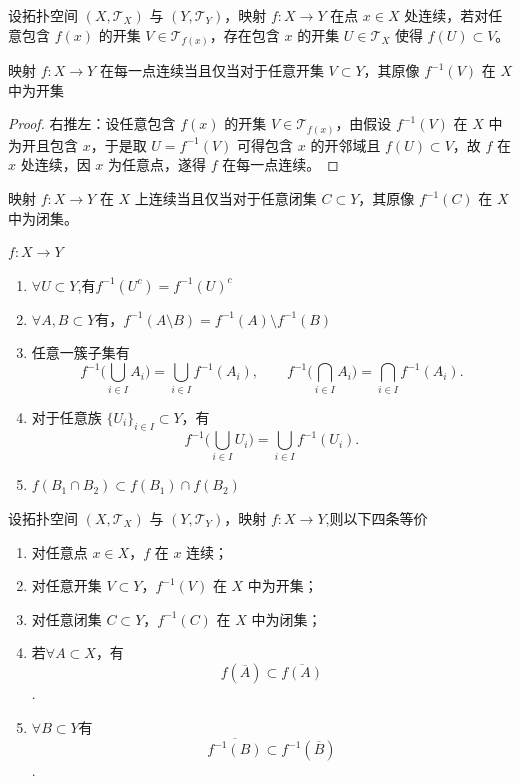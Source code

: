 \documentclass[lang=cn,a4paper,newtx,figureplace=section,tableplace=section]{elegantbook}
\begin{document}
\begin{definition}[连续性]\label{def:continuity}设拓扑空间 $(X,\mathcal{T}_X)$ 与 $(Y,\mathcal{T}_Y)$，映射 $f:X\to Y$ 在点 $x\in X$ 处连续，若对任意包含 $f(x)$ 的开集 $V\in\mathcal{T}_{f(x)}$，存在包含 $x$ 的开集 $U\in\mathcal{T}_X$ 使得 $f(U)\subset V$。\end{definition}
\begin{proposition}
映射 $f:X\to Y$ 在每一点连续当且仅当对于任意开集 $V\subset Y$，其原像 $f^{-1}(V)$ 在 $X$ 中为开集
\end{proposition}
\begin{proof}
    右推左：设任意包含 $f(x)$ 的开集 $V\in\mathcal{T}_{f(x)}$，由假设 $f^{-1}(V)$ 在 $X$ 中为开且包含 $x$，于是取 $U=f^{-1}(V)$ 可得包含 $x$ 的开邻域且 $f(U)\subset V$，故 $f$ 在 $x$ 处连续，因 $x$ 为任意点，遂得 $f$ 在每一点连续。
\end{proof}
\begin{proposition}映射 $f:X\to Y$ 在 $X$ 上连续当且仅当对于任意闭集 $C\subset Y$，其原像 $f^{-1}(C)$ 在 $X$ 中为闭集。\end{proposition}
\begin{proposition}
    $f:X\to Y$ 
    \begin{enumerate}
        \item $\forall U\subset Y$,有$f^{-1}(U^c)=f^{-1}(U)^c$
        \item $\forall A,B\subset Y$有，$f^{-1}(A\setminus B)=f^{-1}(A)\setminus f^{-1}(B)$
        \item 任意一簇子集有
\begin{equation}
f^{-1}\Big(\bigcup_{i\in I}A_i\Big)=\bigcup_{i\in I}f^{-1}(A_i),\qquad
f^{-1}\Big(\bigcap_{i\in I}A_i\Big)=\bigcap_{i\in I}f^{-1}(A_i).
\end{equation}
        \item 对于任意族 $\{U_i\}_{i\in I}\subset Y$，有
\begin{equation*}
f^{-1}\Big(\bigcup_{i\in I} U_i\Big)=\bigcup_{i\in I} f^{-1}(U_i).
\end{equation*}
    \item $f(B_1\cap B_2)\subset f(B_1)\cap f(B_2) $
    \end{enumerate}
\end{proposition}
\begin{proposition}
设拓扑空间 $(X,\mathcal{T}_X)$ 与 $(Y,\mathcal{T}_Y)$，映射 $f:X\to Y$,则以下四条等价
    \begin{enumerate} \item 对任意点 $x\in X$，$f$ 在 $x$ 连续； \item 对任意开集 $V\subset Y$，$f^{-1}(V)$ 在 $X$ 中为开集； \item 对任意闭集 $C\subset Y$，$f^{-1}(C)$ 在 $X$ 中为闭集； \item 若$\forall A\subset X$，有
\begin{equation}
f(\overline{A})\subset\overline{f(A)}
\end{equation}. 
    \item $\forall B\subset Y$有 \begin{equation} \overline{f^{-1}(B)}\subset f^{-1}(\overline{B}) \end{equation}.
\end{enumerate}
\end{proposition}
\end{document}
